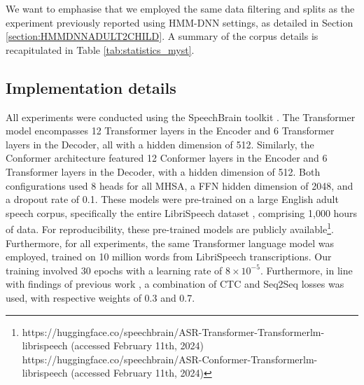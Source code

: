 We want to emphasise that we employed the same data filtering and splits as the experiment previously reported using \ac{HMM-DNN} settings, as detailed in Section \ref{section:HMMDNNADULT2CHILD}. A summary of the corpus details is recapitulated in Table \ref{tab:statistics_myst}.

\subsection{Implementation details}
\label{section:TransformerConformerDetails}
All experiments were conducted using the SpeechBrain toolkit \cite{speechbrain}. The Transformer model encompasses 12 Transformer layers in the Encoder and 6 Transformer layers in the Decoder, all with a hidden dimension of 512. Similarly, the Conformer architecture featured 12 Conformer layers in the Encoder and 6 Transformer layers in the Decoder, with a hidden dimension of 512. Both configurations used 8 heads for all \ac{MHSA}, a \ac{FFN} hidden dimension of 2048, and a dropout rate of 0.1. These models were pre-trained on a large English adult speech corpus, specifically the entire LibriSpeech dataset \cite{librispeech}, comprising 1,000 hours of data. For reproducibility, these pre-trained models are publicly available\footnote{https://huggingface.co/speechbrain/ASR-Transformer-Transformerlm-librispeech (accessed February 11th, 2024)\\ https://huggingface.co/speechbrain/ASR-Conformer-Transformerlm-librispeech (accessed February 11th, 2024)}. Furthermore, for all experiments, the same Transformer language model was employed, trained on 10 million words from LibriSpeech transcriptions. Our training involved 30 epochs with a learning rate of $8 \times 10^{-5}$. Furthermore, in line with findings of previous work \cite{gelin2021endtoend}, a combination of \ac{CTC} and \ac{Seq2Seq} losses was used, with respective weights of 0.3 and 0.7.

